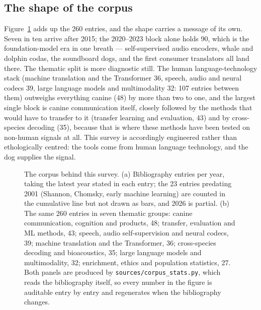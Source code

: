 \subsection{The shape of the corpus}
Figure~\ref{fig:corpus} adds up the 260 entries, and the shape carries a
message of its own. Seven in ten arrive after 2015; the 2020--2023 block alone
holds 90, which is the foundation-model era in one breath --- self-supervised
audio encoders, whale and dolphin codas, the soundboard dogs, and the first
consumer translators all land there. The thematic split is more diagnostic
still. The human language-technology stack (machine translation and the
Transformer 36, speech, audio and neural codecs 39, large language models and
multimodality 32: 107 entries between them) outweighs everything canine
(48) by more than two to one, and the largest single block is canine
communication itself, closely followed by the methods that would have to
transfer to it (transfer learning and evaluation, 43) and by cross-species
decoding (35), because that is where these methods have been tested on
non-human signals at all. This
survey is accordingly engineered rather than ethologically centred: the tools
come from human language technology, and the dog supplies the signal.

\begin{figure}[htbp]
\centering
\resizebox{\textwidth}{!}{}
\caption{The corpus behind this survey. (a) Bibliography entries per year,
taking the latest year stated in each entry; the 23 entries predating 2001
(Shannon, Chomsky, early machine learning) are counted in the cumulative line
but not drawn as bars, and 2026 is partial. (b) The same 260 entries in seven
thematic groups: canine communication, cognition and products, 48; transfer,
evaluation and ML methods, 43; speech, audio self-supervision and neural
codecs, 39; machine translation and the Transformer, 36; cross-species decoding
and bioacoustics, 35; large language models and multimodality, 32; enrichment,
ethics and population statistics, 27. Both panels are produced by
\texttt{sources/corpus\_stats.py}, which reads the bibliography itself, so
every number in the figure is auditable entry by entry and regenerates when
the bibliography changes.}
\label{fig:corpus}
\end{figure}
